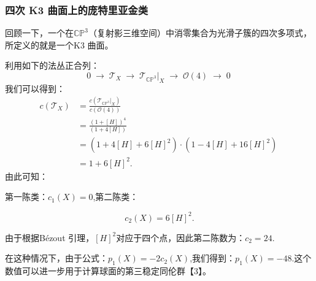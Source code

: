 \subsubsection{四次 K3 曲面上的庞特里亚金类}
回顾一下，一个在$\mathbb{CP}^3$（复射影三维空间）中消零集合为光滑子簇的四次多项式，所定义的就是一个K3 曲面。

利用如下的法丛正合列：
$$
0 \;\longrightarrow\; \mathcal{T}_X
\;\longrightarrow\; \mathcal{T}_{\mathbb{CP}^3}|_X
\;\longrightarrow\; \mathcal{O}(4)
\;\longrightarrow\; 0~
$$
我们可以得到：
$$
\begin{aligned}
c(\mathcal{T}_X)
&= \frac{c(\mathcal{T}_{\mathbb{CP}^3}|_X)}{c(\mathcal{O}(4))} \\[6pt]
&= \frac{(1 + [H])^4}{(1 + 4[H])} \\[6pt]
&= (1 + 4[H] + 6[H]^2) \cdot (1 - 4[H] + 16[H]^2) \\[6pt]
&= 1 + 6[H]^2.
\end{aligned}~
$$
由此可知：

第一陈类：$c_1(X) = 0$,第二陈类：

  $$
  c_2(X) = 6[H]^2.
  $$

由于根据Bézout 引理，$[H]^2$对应于四个点，因此第二陈数为：$c_2 = 24$.

在这种情况下，由于公式：$p_1(X) = -2c_2(X)$,我们得到：$p_1(X) = -48$.这个数值可以进一步用于计算球面的第三稳定同伦群【3】。
